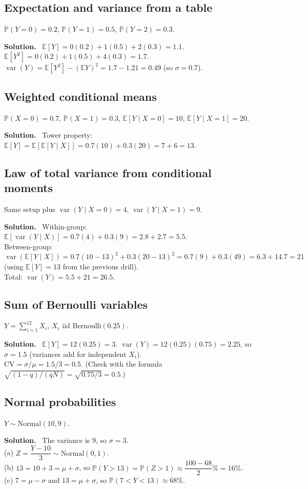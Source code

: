 \documentclass[11pt]{article}
\newcommand{\E}{\mathbb{E}}
\newcommand{\Var}{\operatorname{var}}
\renewcommand{\P}{\mathbb{P}}
\newcommand{\Bern}{\text{Bernoulli}}
\newcommand{\Norm}{\text{Normal}}
\newenvironment{soln}{\par\smallskip\noindent\textbf{Solution.}\ }{\par\medskip}
\begin{document}
\subsection*{Expectation and variance from a table}
$\P(Y{=}0)=0.2$, $\P(Y{=}1)=0.5$, $\P(Y{=}2)=0.3$.
\begin{soln}
$\E[Y]=0(0.2)+1(0.5)+2(0.3)=1.1$. \quad $\E[Y^2]=0(0.2)+1(0.5)+4(0.3)=1.7$.\\
$\Var(Y)=\E[Y^2]-(\E Y)^2=1.7-1.21=0.49$ (so $\sigma=0.7$).
\end{soln}

\subsection*{Weighted conditional means}
$\P(X{=}0)=0.7$, $\P(X{=}1)=0.3$, $\E[Y\mid X{=}0]=10$, $\E[Y\mid X{=}1]=20$.
\begin{soln}
Tower property: $\E[Y]=\E[\E[Y\mid X]]=0.7(10)+0.3(20)=7+6=13$.
\end{soln}

\subsection*{Law of total variance from conditional moments}
Same setup plus $\Var(Y\mid X{=}0)=4$, $\Var(Y\mid X{=}1)=9$.
\begin{soln}
Within-group: $\E[\Var(Y\mid X)]=0.7(4)+0.3(9)=2.8+2.7=5.5$.\\
Between-group: $\Var(\E[Y\mid X])=0.7(10-13)^2+0.3(20-13)^2=0.7(9)+0.3(49)=6.3+14.7=21$ (using $\E[Y]=13$ from the previous drill).\\
Total: $\Var(Y)=5.5+21=26.5$.
\end{soln}

\subsection*{Sum of Bernoulli variables}
$Y=\sum_{i=1}^{12}X_i$, $X_i$ iid $\Bern(0.25)$.
\begin{soln}
$\E[Y]=12(0.25)=3$. \quad $\Var(Y)=12(0.25)(0.75)=2.25$, so $\sigma=1.5$ (variances add for independent $X_i$).\\
$\mathrm{CV}=\sigma/\mu=1.5/3=0.5$. (Check with the formula $\sqrt{(1-q)/(qN)}=\sqrt{0.75/3}=0.5$.)
\end{soln}

\subsection*{Normal probabilities}
$Y\sim\Norm(10,9)$.
\begin{soln}
The variance is $9$, so $\sigma=3$.\\
(a) $Z=\dfrac{Y-10}{3}\sim\Norm(0,1)$.\\
(b) $13=10+3=\mu+\sigma$, so $\P(Y>13)=\P(Z>1)\approx\dfrac{100-68}2\%=16\%$.\\
(c) $7=\mu-\sigma$ and $13=\mu+\sigma$, so $\P(7<Y<13)\approx68\%$.
\end{soln}
\end{document}
